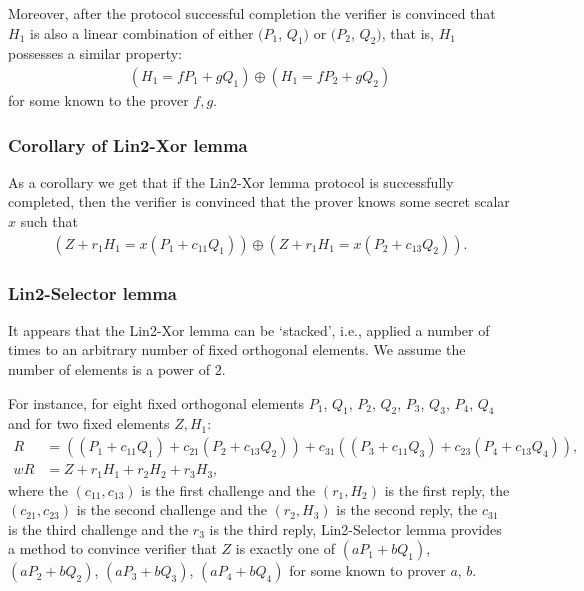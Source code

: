 \documentclass{mathcryptology} %
\theoremstyle{title}
\theoremstyle{titleof}
\begin{document}
    Moreover, after the protocol successful completion the verifier is convinced that $H_{1}$ is also a linear combination of either $(P_{1}$, $Q_{1})$ or $(P_{2}$, $Q_{2})$, that is, $H_{1}$ possesses a similar property:
    \begin{align*}
        (H_{1}=fP_{1}+gQ_{1}) \oplus (H_{1}=fP_{2}+gQ_{2})
    \end{align*}          
    for some known to the prover $f, g$.
    
\subsubsection{Corollary of Lin2-Xor lemma}
    As a corollary we get that if the Lin2-Xor lemma protocol is successfully completed, then the verifier is convinced that the prover knows some secret scalar $x$ such that
    \begin{align*}
        (Z+r_{1}H_{1}=x(P_{1}+c_{11}Q_{1})) \oplus (Z+r_{1}H_{1}=x(P_{2}+c_{13}Q_{2})).
    \end{align*}       
    
\subsubsection{Lin2-Selector lemma}   
    It appears that the Lin2-Xor lemma can be `stacked', i.e., applied a number of times to an arbitrary number of fixed orthogonal elements. We assume the number of elements is a power of $2$. 
    
    For instance, for eight fixed orthogonal elements $P_{1}$, $Q_{1}$, $P_{2}$, $Q_{2}$, $P_{3}$, $Q_{3}$, $P_{4}$, $Q_{4}$ and for two fixed elements $Z, H_{1}$:
    \begin{align*}
        R & = \left( \left( P_{1}+c_{11}Q_{1}\right)+c_{21}\left(P_{2}+c_{13}Q_{2}\right) \right) + c_{31} \left( \left(P_{3}+c_{11}Q_{3}\right)+c_{23}\left(P_{4}+c_{13}Q_{4}\right)\right),\\
        wR & = Z+r_{1}H_{1}+r_{2}H_{2}+r_{3}H_{3},
    \end{align*}
    where the $(c_{11}, c_{13})$ is the first challenge and the $(r_{1}, H_{2})$ is the first reply, the $(c_{21}, c_{23})$ is the second challenge and the $(r_{2}, H_{3})$ is the second reply, the $c_{31}$ is the third challenge and the $r_{3}$ is the third reply, Lin2-Selector lemma provides a method to convince verifier that $Z$ is exactly one of $(a P_{1}+b Q_{1})$, $(a P_{2}+b Q_{2})$, $(aP_{3}+bQ_{3})$, $(aP_{4}+bQ_{4})$ for some known to prover $a$, $b$.
    
\end{document}
